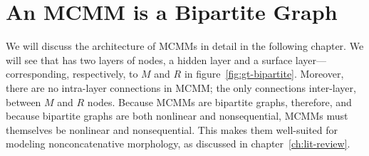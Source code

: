 
\section{An MCMM is a Bipartite Graph}\label{sec:mcmm-bipartite}
We will discuss the architecture of MCMMs in detail in the following chapter. 
We will see  that has two
layers of nodes, a hidden layer and a
surface layer---corresponding, respectively, to $M$ and $R$ in
figure~\ref{fig:gt-bipartite}. Moreover, there are no intra-layer connections in
MCMM; the only connections inter-layer, between $M$ and $R$ nodes.
Because MCMMs are bipartite graphs, therefore, and because bipartite graphs 
are both nonlinear and nonsequential, 
MCMMs must themselves be nonlinear and nonsequential. This makes them well-suited for modeling
nonconcatenative morphology, as discussed in chapter~\ref{ch:lit-review}.


%

